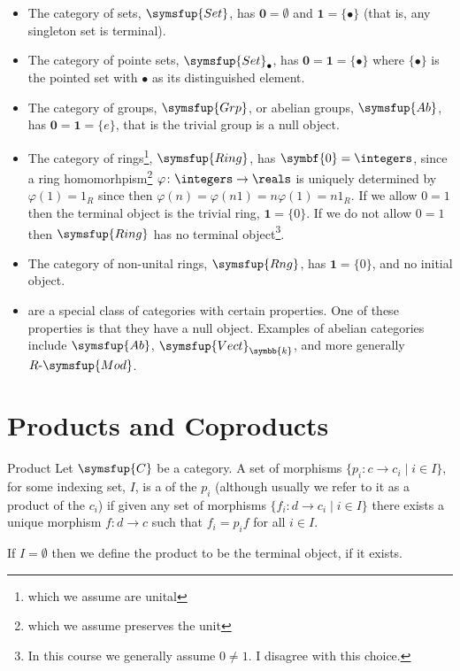 \documentclass[fleqn]{NotesClass}
\makeatletter
\newcommand{\cat}[1]{\symsfup{#1}}
\newcommand{\initial}{\symbf{0}}
\newcommand{\terminal}{\symbf{1}}
\newcommand{\c@egory}[1]{\symsfup{#1}}
\newcommand{\Set}{\c@egory{Set}}
\newcommand{\SetPt}{\c@egory{Set}_{\bullet}}
\newcommand{\Grp}{\c@egory{Grp}}
\newcommand{\Ab}{\c@egory{Ab}}
\newcommand{\Ring}{\c@egory{Ring}}
\newcommand{\Rng}{\c@egory{Rng}}
\newcommand{\Vect}[1][\field]{\c@egory{Vect}_{#1}}
\newcommand{\RMod}[1][R]{#1\text{-}\c@egory{Mod}}
\renewcommand{\field}{\symbb{k}}
\makeatother
\begin{document}
    \begin{exm}{}{}
        \begin{itemize}
            \item The category of sets, \(\Set\), has \(\initial = \emptyset\) and \(\terminal = \{\bullet\}\) (that is, any singleton set is terminal).
            \item The category of pointe sets, \(\SetPt\), has \(\initial = \terminal = \{\bullet\}\) where \(\{\bullet\}\) is the pointed set with \(\bullet\) as its distinguished element.
            \item The category of groups, \(\Grp\), or abelian groups, \(\Ab\), has \(\initial = \terminal = \{e\}\), that is the trivial group is a null object.
            \item The category of rings\footnote{which we assume are unital}, \(\Ring\), has \(\initial = \integers\), since a ring homomorhpism\footnote{which we assume preserves the unit} \(\varphi \colon \integers \to \reals\) is uniquely determined by \(\varphi(1) = 1_R\) since then \(\varphi(n) = \varphi(n 1) = n \varphi(1) = n 1_R\).
            If we allow \(0 = 1\) then the terminal object is the trivial ring, \(\terminal = \{0\}\).
            If we do not allow \(0 = 1\) then \(\Ring\) has no terminal object\footnote{In this course we generally assume \(0 \ne 1\). I disagree with this choice.}.
            \item The category of non-unital rings, \(\Rng\), has \(\terminal = \{0\}\), and no initial object.
            \item {} are a special class of categories with certain properties.
            One of these properties is that they have a null object.
            Examples of abelian categories include \(\Ab\), \(\Vect\), and more generally \(\RMod\).
        \end{itemize}
    \end{exm}
    
    \section{Products and Coproducts}
    \begin{dfn}{Product}{}
        Let \(\cat{C}\) be a category.
        A set of morphisms \(\{p_i \colon c \to c_i \mid i \in I\}\), for some indexing set, \(I\), is a  of the \(p_i\) (although usually we refer to it as a product of the \(c_i\)) if given any set of morphisms \(\{f_i \colon d \to c_i \mid i \in I\}\) there exists a unique morphism \(f \colon d \to c\) such that \(f_i = p_i f\) for all \(i \in I\).
        
        If \(I = \emptyset\) then we define the product to be the terminal object, if it exists.
    \end{dfn}
    
\end{document}

